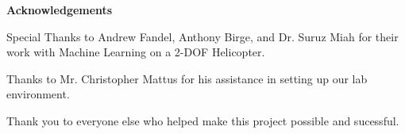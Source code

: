
\begin{center}\textbf{Acknowledgements}\end{center}

    \par Special Thanks to Andrew Fandel, Anthony Birge, and Dr. Suruz Miah for their work with Machine Learning on a 2-DOF Helicopter.
    \par Thanks to Mr. Christopher Mattus for his assistance in setting up our lab environment.
    \par Thank you to everyone else who helped make this project possible and sucessful.


\cleardoublepage



